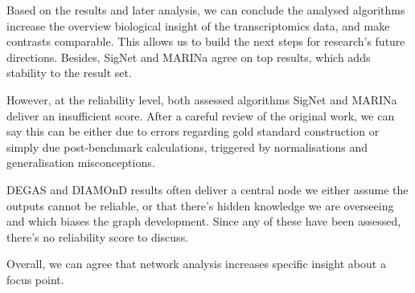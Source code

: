 Based on the results and later analysis, we can conclude the analysed algorithms increase the overview biological insight of the transcriptomics data, and make contrasts comparable. This allows us to build the next steps for research’s future directions. Besides, SigNet and MARINa agree on top results, which adds stability to the result set.

However, at the reliability level, both assessed algorithms SigNet and MARINa deliver an insufficient score. After a careful review of the original work, we can say this can be either due to errors regarding gold standard construction or simply due post-benchmark calculations, triggered by normalisations and generalisation misconceptions.

DEGAS and DIAMOnD results often deliver a central node we either assume the outputs cannot be reliable, or that there’s hidden knowledge we are overseeing and which biases the graph development. Since any of these have been assessed, there’s no reliability score to discuss.

Overall, we can agree that network analysis increases specific insight about a focus point.
